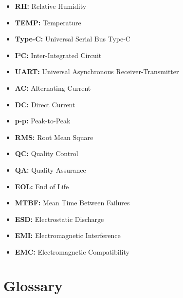 \documentclass[a4paper,12pt]{article}
\begin{document}
\begin{itemize}
\item \textbf{RH:} Relative Humidity
\item \textbf{TEMP:} Temperature

\item \textbf{Type-C:} Universal Serial Bus Type-C
\item \textbf{I²C:} Inter-Integrated Circuit
\item \textbf{UART:} Universal Asynchronous Receiver-Transmitter

\item \textbf{AC:} Alternating Current
\item \textbf{DC:} Direct Current
\item \textbf{p-p:} Peak-to-Peak
\item \textbf{RMS:} Root Mean Square

\item \textbf{QC:} Quality Control
\item \textbf{QA:} Quality Assurance
\item \textbf{EOL:} End of Life
\item \textbf{MTBF:} Mean Time Between Failures

\item \textbf{ESD:} Electrostatic Discharge
\item \textbf{EMI:} Electromagnetic Interference
\item \textbf{EMC:} Electromagnetic Compatibility

\end{itemize}

\newpage
\section{Glossary}
\end{document}
